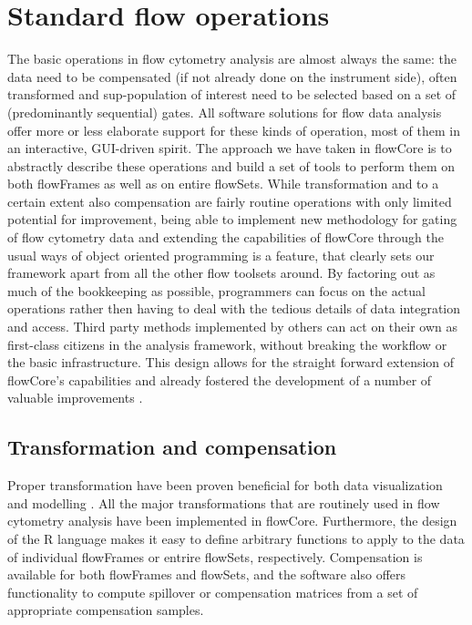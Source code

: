\documentclass[12pt]{article}
\begin{document}
\section*{Standard flow operations}
The basic operations in flow cytometry analysis are almost always the
same: the data need to be compensated (if not already done on the
instrument side), often transformed and sup-population of interest
need to be selected based on a set of (predominantly sequential)
gates. All software solutions for flow data analysis offer more or
less elaborate support for these kinds of operation, most of them in
an interactive, GUI-driven spirit. The approach we have taken in
flowCore is to abstractly describe these operations and build a set of
tools to perform them on both flowFrames as well as on entire
flowSets. While transformation and to a certain extent also
compensation are fairly routine operations with only limited potential
for improvement, being able to implement new methodology for gating of
flow cytometry data and extending the capabilities of flowCore through
the usual ways of object oriented programming is a feature, that
clearly sets our framework apart from all the other flow toolsets
around. By factoring out as much of the bookkeeping as possible,
programmers can focus on the actual operations rather then having to
deal with the tedious details of data integration and access. Third
party methods implemented by others can act on their own as
first-class citizens in the analysis framework, without breaking the
workflow or the basic infrastructure. This design allows for the
straight forward extension of flowCore's capabilities and already
fostered the development of a number of valuable
improvements \citep{lo2008agf, sarkar2008ufv}.




\subsection*{Transformation and compensation}
Proper transformation have been proven beneficial for both data
visualization and modelling \citep{lo2008agf}. All the
major transformations that are routinely used in flow cytometry
analysis have been implemented in flowCore. Furthermore, the design of
the R language makes it easy to define arbitrary functions to apply to
the data of individual flowFrames or entrire flowSets,
respectively. Compensation is available for both flowFrames and
flowSets, and the software also offers functionality to compute
spillover or compensation matrices from a set of appropriate
compensation samples. 
\end{document}
